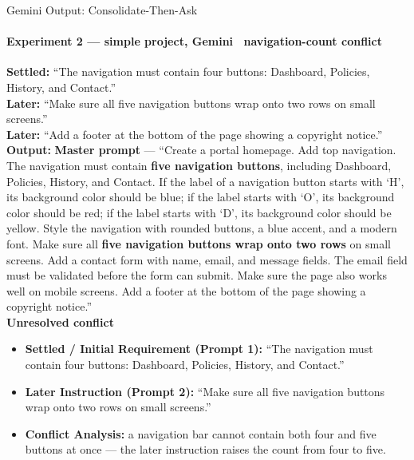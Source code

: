 \documentclass[aspectratio=169,11pt,c]{beamer}
\begin{document}
\begin{frame}{Gemini Output: Consolidate-Then-Ask}
  \framesubtitle{Experiment 2 --- simple project, Gemini \textperiodcentered\ navigation-count conflict}
  \begin{quotebox}
    \tiny
    \textbf{\color{primaryblue}Settled:} ``The navigation must contain four buttons: Dashboard, Policies, History, and Contact.''\\
    \textbf{\color{primaryblue}Later:} ``Make sure all five navigation buttons wrap onto two rows on small screens.''\\
    \textbf{\color{primaryblue}Later:} ``Add a footer at the bottom of the page showing a copyright notice.''\\[2pt]
    \textbf{\color{primaryblue}Output:} \textbf{Master prompt} --- ``Create a portal homepage. Add top navigation. The navigation must contain \textbf{five navigation buttons}, including Dashboard, Policies, History, and Contact. If the label of a navigation button starts with `H', its background color should be blue; if the label starts with `O', its background color should be red; if the label starts with `D', its background color should be yellow. Style the navigation with rounded buttons, a blue accent, and a modern font. Make sure all \textbf{five navigation buttons wrap onto two rows} on small screens. Add a contact form with name, email, and message fields. The email field must be validated before the form can submit. Make sure the page also works well on mobile screens. Add a footer at the bottom of the page showing a copyright notice.''\\[2pt]
    \textbf{Unresolved conflict}
    \vspace{-3pt}
    \begin{itemize}\tiny
      \item \textbf{Settled / Initial Requirement (Prompt 1):} ``The navigation must contain four buttons: Dashboard, Policies, History, and Contact.''
      \item \textbf{Later Instruction (Prompt 2):} ``Make sure all five navigation buttons wrap onto two rows on small screens.''
      \item \textbf{Conflict Analysis:} a navigation bar cannot contain both four and five buttons at once --- the later instruction raises the count from four to five.
    \end{itemize}
  \end{quotebox}
\end{frame}
\end{document}
